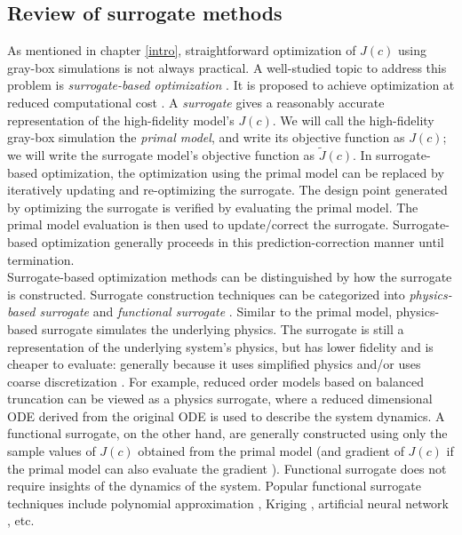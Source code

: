 \documentclass[a4paper,onecolumn]{article}
\theoremstyle{remark}
\begin{document}
\subsection{Review of surrogate methods}
\label{review surrogate methods}
\noindent As mentioned in chapter \ref{intro}, 
straightforward optimization of $J(c)$ using gray-box simulations
is not always practical.
A well-studied topic to address this problem is \emph{surrogate-based optimization}
\cite{Opt Koziel Book, Surrogate based analysis and optimization}.
It is proposed to achieve optimization at reduced computational cost \cite{Space mapping 1}.
A \emph{surrogate} gives a reasonably accurate representation of the high-fidelity model's $J(c)$.
We will call the high-fidelity gray-box simulation
the \emph{primal model}, and write its objective function as $J(c)$;
we will write the surrogate model's objective function as $\tilde{J}(c)$.
In surrogate-based optimization, the optimization using the primal model can be
replaced by iteratively updating and re-optimizing the surrogate.
The design point generated by optimizing the surrogate is verified by evaluating
the primal model. The primal model evaluation is then used to update/correct the surrogate.
Surrogate-based optimization generally proceeds in this prediction-correction manner until
termination.\\

\noindent Surrogate-based optimization methods can be distinguished by how the surrogate is 
constructed. Surrogate construction techniques can be categorized into
\emph{physics-based surrogate} and \emph{functional surrogate} \cite{Opt Koziel Book}.
Similar to the primal model, physics-based surrogate simulates the underlying physics.
The surrogate is still a representation of the underlying system's physics, but has 
lower fidelity and is cheaper to evaluate: generally because it
uses simplified physics \cite{simplified physics, Space mapping 1} and/or
uses coarse discretization \cite{coarse discretization}. For example, reduced order
models based on balanced truncation \cite{Balanced truncation} can be viewed as 
a physics surrogate, where a reduced dimensional ODE derived from the original 
ODE is used to describe the system dynamics.
A functional surrogate, on the other hand, are generally constructed using only the sample
values of $J(c)$ obtained from the primal model (and gradient of $J(c)$ if
the primal model can also evaluate the gradient \cite{gradient kriging surrogate}).
Functional surrogate does not require insights of the dynamics of the system. 
Popular functional surrogate techniques include polynomial approximation 
\cite{poly functional surrogate}, Kriging \cite{kriging functional surrogate},
artificial neural network \cite{ann functional surrogate}, etc.\\
\end{document}

